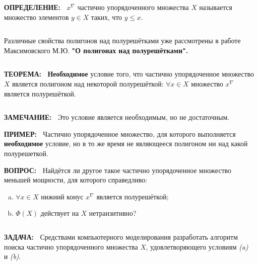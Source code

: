 \documentclass{beamer}
\newcommand{\green}{\color[rgb]{0,0.4,0}}
\newcommand{\red}{\color[rgb]{0.7,0,0}}
\newcommand{\blue}{\color{blue}}
\newcommand{\theor}{%
     {\bf \green ТЕОРЕМА:\ }}
\newcommand{\definit}{%
     {\bf \green ОПРЕДЕЛЕНИЕ:\ }}
\newcommand{\examp}{%
     {\bf \green ПРИМЕР:\ }}
\newcommand{\remark}{%
     {\bf \green ЗАМЕЧАНИЕ:\ }}
\newcommand{\question}{%
     {\bf \green ВОПРОС:\ }}
\newcommand{\goal}{%
     {\bf \green ЗАДАЧА:\ }}
\newcommand{\retline}{
	
$ $

}
\begin{document}
\begin{frame}

{\definit}
\textit{\blue{Нижним конусом}} $x^\nabla$ частично упорядоченного множества $X$ называется множество элементов $y \in X$ таких, что $y \leq x$.
{\retline}

Различные свойства полигонов над полурешётками уже рассмотрены в работе Максимовского М.Ю.
{\bf {\red} "О полигонах над полурешётками".}

{\retline}
{\theor}
\textbf{Необходимое} условие того, что частично упорядоченное множество $X$ является полигоном над некоторой полурешёткой: $\forall x \in X$ множество $x^\nabla$ является полурешёткой.

{\retline}
{\remark}
Это условие является необходимым, но не достаточным.
\end{frame}

\begin{frame}

{\examp}
Частично упорядоченное множество, для которого выполняется \textbf{необходимое} условие, но в то же время не являющееся полигоном ни над какой полурешеткой.

\begin{center}
\end{center}
\end{frame}


\begin{frame}

{\question}
Найдётся ли другое такое частично упорядоченное множество меньшей мощности, для которого справедливо:
\begin{enumerate}[(a)]
	\item
$\forall x \in X$ нижний конус $x^\nabla$ является полурешёткой;
	\item
$\Phi(X)$ действует на $X$ нетранзитивно?
\end{enumerate}
{\retline}

{\goal}
Средствами компьютерного моделирования разработать алгоритм поиска частично упорядоченного множества $X$, удовлетворяющего условиям \textit{(a)} и \textit{(b)}.
\end{frame}
\end{document}
